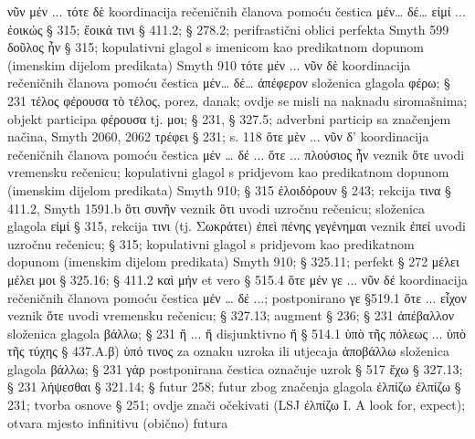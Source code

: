 \begin{description}[noitemsep]
νῦν μέν ... τότε δὲ	koordinacija rečeničnih članova pomoću čestica μέν… δέ…
εἰμί ... ἐοικώς	§ 315; ἔοικά τινι § 411.2; § 278.2; perifrastični oblici perfekta Smyth 599
δοῦλος ἦν	§ 315; kopulativni glagol s imenicom kao predikatnom dopunom
(imenskim dijelom predikata) Smyth 910
τότε μέν ... νῦν δὲ 	koordinacija rečeničnih članova pomoću čestica μέν… δέ…
ἀπέφερον	složenica glagola φέρω; § 231
τέλος φέρουσα 
	τὸ τέλος, porez, danak; ovdje se misli na naknadu siromašnima; objekt participa φέρουσα tj. μοι; § 231, § 327.5; adverbni particip sa značenjem načina, Smyth 2060, 2062
τρέφει	§ 231; s. 118
ὅτε μὲν ... νῦν δ' 	koordinacija rečeničnih članova pomoću čestica μέν … δέ ...
ὅτε ... πλούσιος ἦν	veznik ὅτε uvodi vremensku rečenicu; kopulativni glagol s pridjevom kao predikatnom dopunom (imenskim dijelom predikata) Smyth 910; § 315 
ἐλοιδόρουν	§ 243; rekcija τινα § 411.2, Smyth 1591.b
ὅτι συνῆν 	veznik ὅτι uvodi uzročnu rečenicu; složenica glagola εἰμί § 315, rekcija τινι (tj. Σωκράτει)
ἐπεὶ πένης γεγένημαι	veznik ἐπεί uvodi uzročnu rečenicu; § 315; kopulativni glagol s pridjevom kao predikatnom dopunom (imenskim dijelom predikata) Smyth 910; § 325.11; perfekt § 272
μέλει	μέλει μοι § 325.16; § 411.2 
καὶ μήν 	et vero § 515.4
ὅτε μέν γε ... νῦν δέ	koordinacija rečeničnih članova pomoću čestica μέν … δέ ...; postponirano γε §519.1
ὅτε ... εἶχον 
	veznik ὅτε uvodi vremensku rečenicu; § 327.13; augment § 236; § 231 
ἀπέβαλλον	složenica glagola βάλλω; § 231
ἤ ... ἤ	disjunktivno ἤ § 514.1
ὑπὸ τῆς πόλεως ...  ὑπὸ τῆς τύχης	§ 437.A.β) ὑπό τινος za oznaku uzroka ili utjecaja
ἀποβάλλω	složenica glagola βάλλω; § 231
γάρ	postponirana čestica označuje uzrok § 517
ἔχω	§ 327.13; § 231
λήψεσθαι	§ 321.14; § futur 258; futur zbog značenja glagola ἐλπίζω
ἐλπίζω	§ 231; tvorba osnove § 251; ovdje znači očekivati (LSJ ἐλπίζω I. A look for, expect); otvara mjesto infinitivu (obično) futura

\end{description}



